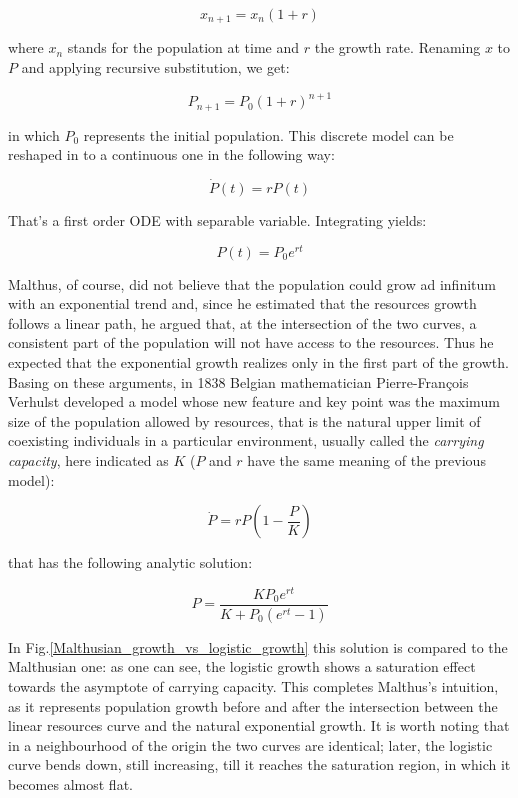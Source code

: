 \documentclass[
12pt, %
a4paper, %
oneside, %
headinclude,footinclude, %
BCOR5mm, %
]{scrartcl}
\begin{document}
\begin{equation}
x_{n+1}=x_{n}(1+r)
\end{equation}

where $x_{n}$ stands for the population at time and $r$ the growth rate. Renaming $x$ to $P$ and applying recursive substitution, we get: 

\begin{equation}
P_{n+1}=P_{0}(1+r)^{n+1}
\end{equation}

in which $P_{0}$ represents the initial population. This discrete model can be reshaped in to a continuous one in the following way: 

\begin{equation}
\dot{P}(t)=rP(t)
\end{equation}

That's a first order ODE with separable variable. Integrating yields:

\begin{equation}
P(t)=P_{0}e^{rt}
\end{equation}

Malthus, of course, did not believe that the population could grow ad infinitum with an exponential trend and, since he estimated that the resources growth follows a linear path, he argued that, at the intersection of the two curves, a consistent part of the population will not have access to the resources. Thus he expected that the exponential growth realizes only in the first part of the growth. Basing on these arguments, in 1838 Belgian mathematician Pierre-François Verhulst developed a model \cite{verhulst1838notice} whose new feature and key point was the maximum size of the population allowed by resources, that is the natural upper limit of coexisting individuals in a particular environment, usually called the \emph{carrying capacity}, here indicated as $K$ ($P$ and $r$ have the same meaning of the previous model):

\begin{equation}
\dot{P}=rP\left(1-\dfrac{P}{K} \right)
\end{equation}

that has the following analytic solution: 

\begin{equation}
P=\dfrac{KP_{0}e^{rt}}{K+P_{0}(e^{rt}-1)}
\label{logistic_equation}
\end{equation}

In Fig.\ref{Malthusian_growth_vs_logistic_growth} this solution is compared to the Malthusian one: as one can see, the logistic growth shows a saturation effect towards the asymptote of carrying capacity. This completes Malthus's intuition, as it represents population growth before and after the intersection between the linear resources curve and the natural exponential growth. It is worth noting that  in a neighbourhood of the origin the two curves are identical; later, the logistic curve bends down, still increasing, till it reaches the saturation region, in which it becomes almost flat. 
\end{document}

